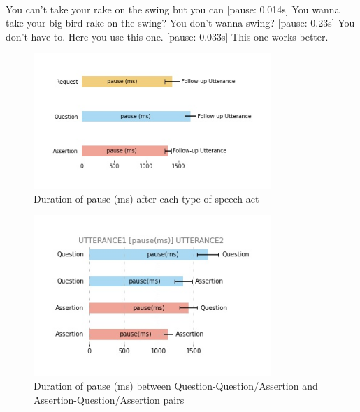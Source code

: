 \\ 
	
\bxl
You can’t take your rake on the swing but you can [pause: 0.014s] You wanna take your big bird rake on the swing? 			\hfill {}
\ex You don't wanna swing? [pause: 0.23s]	You don’t have to.	\hfill {}
\ex Here you use this one. [pause: 0.033s] This one works better.	\hfill {}
\exl
\eex

\begin{figure}[H]
\begin{center}
\includegraphics[width = 0.8\textwidth]{figures/pause.jpg}
	\caption{Duration of pause (ms) after each type of speech act}\label{fig:engsp:pause}
\end{center}
\end{figure}

\begin{figure}[H]
\begin{center}
\includegraphics[width = 0.8\textwidth]{figures/pause-QA.jpg}
	\caption{Duration of pause (ms) between Question-Question/Assertion and Assertion-Question/Assertion pairs }\label{fig:engsp:pause-QA}
\end{center}
\end{figure}

